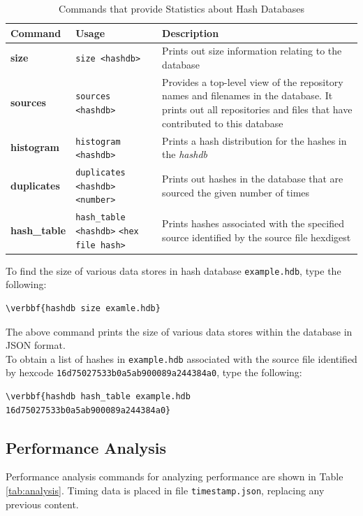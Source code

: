 \documentclass[11pt,fleqn]{article} %
\begin{document}
\begin{table}[!ht]
\centering
\caption{Commands that provide Statistics about Hash Databases}
\label{tab:statistics}
\begin{tabular}{|p{3.5 cm}|p{6 cm}|p{4 cm}|}
\hline \hline
\textbf{Command} & \textbf{Usage} & \textbf{Description} \\
\hline
\textbf{size} & \verb+size <hashdb>+ & Prints out size information relating to the database\\
\hline
\textbf{sources} & \verb+sources <hashdb>+ & Provides a top-level view of the repository names and filenames in the database. It prints out all repositories and files that have contributed to this database\\
\hline
\textbf{histogram} & \verb+histogram <hashdb>+ &  Prints a hash distribution for the hashes in the \textit{hashdb}\\
\hline
\textbf{duplicates} & \verb+duplicates <hashdb> <number>+ &  Prints out hashes in the database that are sourced the given number of times\\
\hline
\textbf{hash\_table} & \verb+hash_table <hashdb>+ \verb+<hex file hash>+ &  Prints hashes associated with the specified source identified by the source file hexdigest\\
\hline
\end{tabular}
\end{table}

To find the size of various data stores in hash database \texttt{example.hdb},
type the following:
\begin{Verbatim}[commandchars=\\\{\}]
\verbbf{hashdb size examle.hdb}
\end{Verbatim}
The above command prints the size of various data stores within the database in JSON format.\\

To obtain a list of hashes in \texttt{example.hdb} associated with the source file identified by hexcode \texttt{16d75027533b0a5ab900089a244384a0}, type the following:
\begin{Verbatim}[commandchars=\\\{\}]
\verbbf{hashdb hash_table example.hdb 16d75027533b0a5ab900089a244384a0}
\end{Verbatim}

\subsection{Performance Analysis}
\label{PerformanceAnalysis}
Performance analysis commands for analyzing \hdb performance are shown in Table \ref{tab:analysis}. Timing data is placed in file \verb+timestamp.json+, replacing any previous content.
\end{document}
